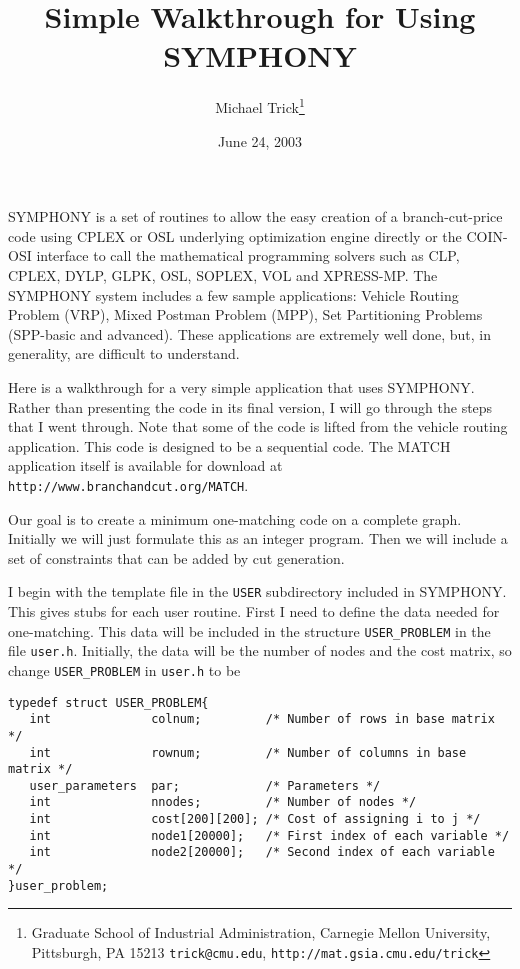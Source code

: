 \documentclass[11pt]{article}
\begin{document}
\title{Simple Walkthrough for Using SYMPHONY}
\author{Michael Trick\thanks{Graduate School of Industrial Administration,
Carnegie Mellon University, Pittsburgh, PA 15213 \texttt{trick@cmu.edu}, 
\texttt{http://mat.gsia.cmu.edu/trick}}}

\date{June 24, 2003}
\maketitle
\thispagestyle{empty}

SYMPHONY is a set of routines to allow the easy creation of a branch-cut-price
code using CPLEX or OSL underlying optimization engine directly or the 
COIN-OSI interface to call the mathematical programming solvers such as CLP, 
CPLEX, DYLP, GLPK, OSL, SOPLEX, VOL and XPRESS-MP. The SYMPHONY system 
includes a few sample applications: Vehicle Routing Problem (VRP), Mixed 
Postman Problem (MPP), Set Partitioning Problems (SPP-basic and advanced). 
These applications are extremely well done, but, in generality, are difficult 
to understand.

Here is a walkthrough for a very simple application that uses SYMPHONY. Rather
than presenting the code in its final version, I will go through the steps 
that I went through. Note that some of the code is lifted from the vehicle 
routing application. This code is designed to be a sequential code. The MATCH application itself is available for download at 
\texttt{http://www.branchandcut.org/MATCH}. 

Our goal is to create a minimum one-matching code on a complete graph.
Initially we will just formulate this as an integer program. Then we will
include a set of constraints that can be added by cut generation.

I begin with the template file in the \texttt{USER} subdirectory included in
SYMPHONY. This gives stubs for each user routine. First I need to define the
data needed for one-matching. This data will be included in the structure
\texttt{USER\_PROBLEM} in the file \texttt{user.h}.  Initially, the data will
be the number of nodes and the cost matrix, so change \texttt{USER\_PROBLEM}
in \texttt{user.h} to be

\begin{verbatim}
typedef struct USER_PROBLEM{
   int              colnum;         /* Number of rows in base matrix */
   int              rownum;         /* Number of columns in base matrix */
   user_parameters  par;            /* Parameters */
   int              nnodes;         /* Number of nodes */
   int              cost[200][200]; /* Cost of assigning i to j */ 
   int              node1[20000];   /* First index of each variable */
   int              node2[20000];   /* Second index of each variable */
}user_problem;
\end{verbatim}
\end{document}
